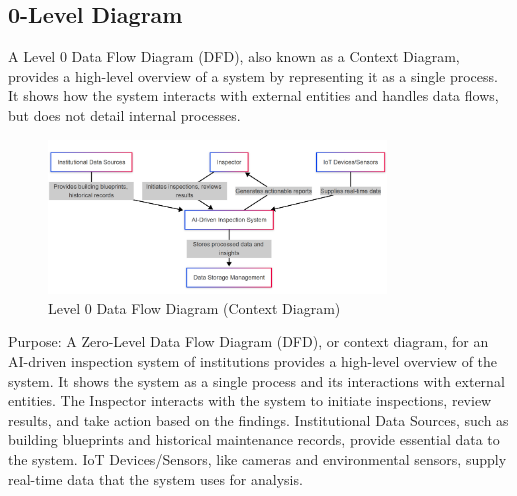 \documentclass[12pt,a4paper]{report}
\begin{document}
\subsection{0-Level Diagram}
A Level 0 Data Flow Diagram (DFD), also known as a Context Diagram, provides a high-level overview of a system by representing it as a single process. It shows how the system interacts with external entities and handles data flows, but does not detail internal processes.

\begin{figure}[H]
    \centering
    \includegraphics[width=0.8\textwidth]{images/level 0.png} %
    \caption{Level 0 Data Flow Diagram (Context Diagram)}
    \label{fig:level-0-dfd}
\end{figure}

Purpose:
A Zero-Level Data Flow Diagram (DFD), or context diagram, for an AI-driven inspection system of institutions provides a high-level overview of the system. It shows the system as a single process and its interactions with external entities. The Inspector interacts with the system to initiate inspections, review results, and take action based on the findings. Institutional Data Sources, such as building blueprints and historical maintenance records, provide essential data to the system. IoT Devices/Sensors, like cameras and environmental sensors, supply real-time data that the system uses for analysis.
\end{document}
